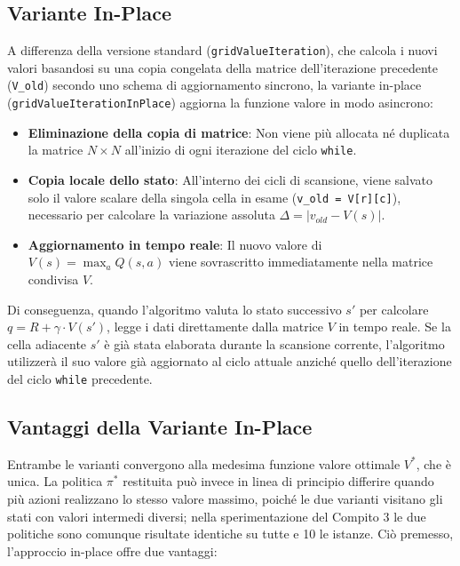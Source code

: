 \subsection{Variante In-Place}
A differenza della versione standard (\texttt{gridValueIteration}), che calcola i nuovi valori basandosi su una copia congelata della matrice dell'iterazione precedente (\texttt{V\_old}) secondo uno schema di aggiornamento sincrono, la variante in-place \\(\texttt{gridValueIterationInPlace}) aggiorna la funzione valore in modo asincrono:
\begin{itemize}
    \item \textbf{Eliminazione della copia di matrice}: Non viene più allocata né duplicata la matrice $N \times N$ all'inizio di ogni iterazione del ciclo \texttt{while}.
    \item \textbf{Copia locale dello stato}: All'interno dei cicli di scansione, viene salvato solo il valore scalare della singola cella in esame (\texttt{v\_old = V[r][c]}), necessario per calcolare la variazione assoluta $\Delta = |v_{old} - V(s)|$.
    \item \textbf{Aggiornamento in tempo reale}: Il nuovo valore di $V(s) = \max_a Q(s, a)$ viene sovrascritto immediatamente nella matrice condivisa $V$.
\end{itemize}

\noindent
Di conseguenza, quando l'algoritmo valuta lo stato successivo $s'$ per calcolare $q = R + \gamma \cdot V(s')$, legge i dati direttamente dalla matrice $V$ in tempo reale. Se la cella adiacente $s'$ è già stata elaborata durante la scansione corrente, l'algoritmo utilizzerà il suo valore già aggiornato al ciclo attuale anziché quello dell'iterazione del ciclo \texttt{while} precedente.

\subsection{Vantaggi della Variante In-Place}
Entrambe le varianti convergono alla medesima funzione valore ottimale $V^*$, che è unica. La politica $\pi^*$ restituita può invece in linea di principio differire quando più azioni realizzano lo stesso valore massimo, poiché le due varianti visitano gli stati con valori intermedi diversi; nella sperimentazione del Compito 3 le due politiche sono comunque risultate identiche su tutte e 10 le istanze. Ciò premesso, l'approccio in-place offre due vantaggi:

